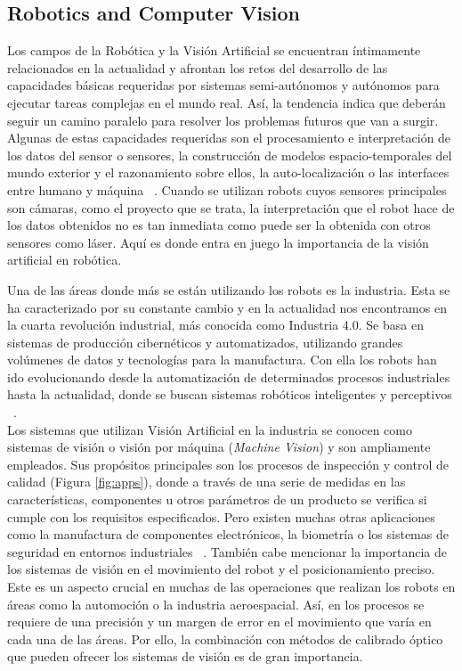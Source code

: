 \documentclass{bmvc2k}
\begin{document}
\subsection{Robotics and Computer Vision} %
Los campos de la Robótica y la Visión Artificial se encuentran íntimamente relacionados en la actualidad y afrontan los retos del desarrollo de las capacidades básicas requeridas por sistemas semi-autónomos y autónomos para ejecutar tareas complejas en el mundo real. Así, la tendencia indica que deberán seguir un camino paralelo para resolver los problemas futuros que van a surgir. Algunas de estas capacidades requeridas son el procesamiento e interpretación de los datos del sensor o sensores, la construcción de modelos espacio-temporales del mundo exterior y el razonamiento sobre ellos, la auto-localización o las interfaces entre humano y máquina ~\cite{campos1998introduction}. Cuando se utilizan robots cuyos sensores principales son cámaras, como el proyecto que se trata, la interpretación que el robot hace de los datos obtenidos no es tan inmediata como puede ser la obtenida con otros sensores como láser. Aquí es donde entra en juego la importancia de la visión artificial en robótica.

Una de las áreas donde más se están utilizando los robots es la industria. Esta se ha caracterizado por su constante cambio y en la actualidad nos encontramos en la cuarta revolución industrial, más conocida como Industria 4.0. Se basa en sistemas de producción cibernéticos y automatizados, utilizando grandes volúmenes de datos y tecnologías para la manufactura. Con ella los robots han ido evolucionando desde la automatización de determinados procesos industriales hasta la actualidad, donde se buscan sistemas robóticos inteligentes y perceptivos ~\cite{perez2016robot}.\\
Los sistemas que utilizan Visión Artificial en la industria se conocen como sistemas de visión o visión por máquina (\textit{Machine Vision}) y son ampliamente empleados. Sus propósitos principales son los procesos de inspección y control de calidad (Figura \ref{fig:apps}), donde a través de una serie de medidas en las características, componentes u otros parámetros de un producto se verifica si cumple con los requisitos especificados. Pero existen muchas otras aplicaciones como la manufactura de componentes electrónicos, la biometría o los sistemas de seguridad en entornos industriales ~\cite{labudzki2014essence}. También cabe mencionar la importancia de los sistemas de visión en el movimiento del robot y el posicionamiento preciso. Este es un aspecto crucial en muchas de las operaciones que realizan los robots en áreas como la automoción o la industria aeroespacial. Así, en los procesos se requiere de una precisión y un margen de error en el movimiento que varía en cada una de las áreas. Por ello, la combinación con métodos de calibrado óptico que pueden ofrecer los sistemas de visión es de gran importancia.
\end{document}
